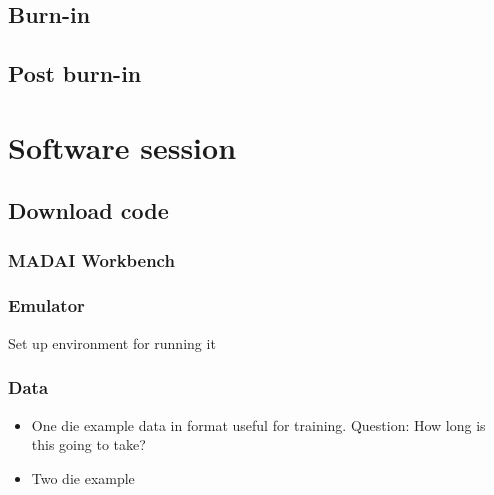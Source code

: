 \documentclass{article}
\begin{document}
\subsection{Burn-in}

\subsection{Post burn-in}



\section{Software session}

\subsection{Download code}

\subsubsection{MADAI Workbench}

\subsubsection{Emulator}

Set up environment for running it

\subsubsection{Data}

\begin{itemize}

\item One die example data in format useful for training. Question: How long is this going to take?

\item Two die example

\end{itemize}
\end{document}
